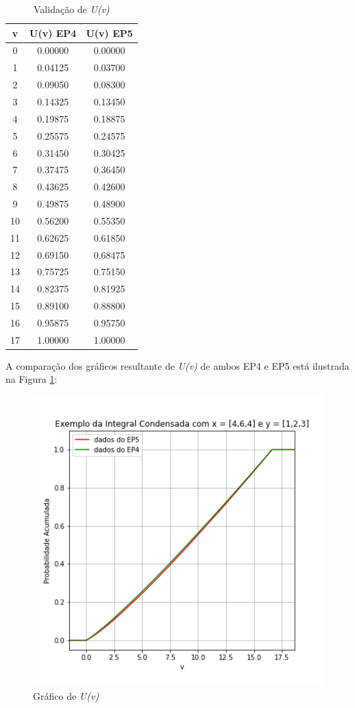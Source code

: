 \documentclass{article}
\begin{document}
\begin{table}[h!]
\centering
 \begin{tabular}{||c c c||} 
 \hline
 v & U(v) EP4 & U(v) EP5 \\ [0.5ex] 
 \hline\hline
0 & 0.00000 & 0.00000 \\
1 & 0.04125 & 0.03700 \\
2 & 0.09050 & 0.08300 \\
3 & 0.14325 & 0.13450 \\
4 & 0.19875 & 0.18875 \\
5 & 0.25575 & 0.24575 \\
6 & 0.31450 & 0.30425 \\
7 & 0.37475 & 0.36450 \\
8 & 0.43625 & 0.42600 \\
9 & 0.49875 & 0.48900 \\
10 & 0.56200 & 0.55350 \\
11 & 0.62625 & 0.61850 \\
12 & 0.69150 & 0.68475 \\
13 & 0.75725 & 0.75150 \\
14 & 0.82375 & 0.81925 \\
15 & 0.89100 & 0.88800 \\
16 & 0.95875 & 0.95750 \\
17 & 1.00000 & 1.00000 \\ [1ex]
 \hline
 \end{tabular}
 \caption{Validação de \textit{U(v)}}
 \label{tab:validation}
\end{table}

\indent A comparação dos gráficos resultante de \textit{U(v)} de ambos EP4 e EP5 está ilustrada na Figura \ref{fig:int}:

\begin{figure}[htp]
  \centering
  \includegraphics[scale=0.85]{Imagens/Integral.png}
  \caption{Gráfico de \textit{U(v)}}
  \label{fig:int}
\end{figure}
\end{document}
